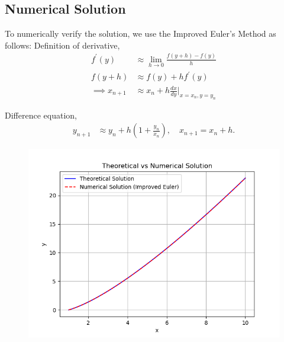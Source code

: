 \documentclass[journal]{IEEEtran}
\begin{document}
\subsection*{Numerical Solution}
To numerically verify the solution, we use the Improved Euler's Method as follows:
Definition of derivative,
\begin{align}
    f^\prime(y) &\approx \lim_{h\to0}\frac{f(y+h)-f(y)}{h} \\
    f(y+h) &\approx f(y)+hf^\prime(y) \\
    \implies x_{n+1} &\approx x_{n} + h\frac{dx}{dy}\Big|_{x=x_{n}, y=y_{n}}
\end{align}

Difference equation,
\begin{align}
    y_{n+1} &\approx y_n + h \left( 1+ \frac{y_{n}}{x_{n}}  \right), \quad x_{n+1} = x_n + h.
\end{align}
\begin{figure}[h]
    \centering
    \includegraphics[width=\columnwidth]{figs/Figure_1.png}    
    \end{figure}
\end{document}
